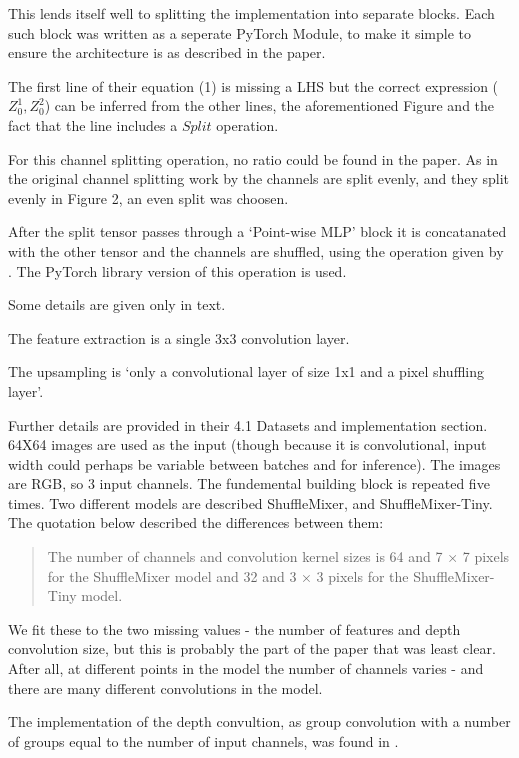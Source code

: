 \documentclass{article}
\begin{document}
    This lends itself well to splitting the implementation into separate blocks. Each such block was written as a seperate PyTorch Module, to make it simple to ensure the architecture is as described in the paper.

    The first line of their equation (1) is missing a LHS but the correct expression ($Z_0^1, Z_0^2$) can be inferred from the other lines, the aforementioned Figure and the fact that the line includes a $Split$ operation.

    For this channel splitting operation, no ratio could be found in the paper. As in the original channel splitting work by \citet{ma2018shufflenet} the channels are split evenly, and they split evenly in Figure 2, an even split was choosen.

    After the split tensor passes through a `Point-wise MLP' block it is concatanated with the other tensor and the channels are shuffled, using the operation given by \citet{zhang2017shufflenet}. The PyTorch library version of this operation is used.

    Some details are given only in text.

    The feature extraction is a single 3x3 convolution layer.

    The upsampling is `only a convolutional layer of size 1x1 and a pixel shuffling layer'.


    Further details are provided in their 4.1 Datasets and implementation section. 64X64 images are used as the input (though because it is convolutional, input width could perhaps be variable between batches and for inference). The images are RGB, so 3 input channels. The fundemental building block is repeated five times. Two different models are described ShuffleMixer, and ShuffleMixer-Tiny. The quotation below described the differences between them:

    \begin{quotation}
        The number of channels and convolution kernel sizes is 64 and
7 × 7 pixels for the ShuffleMixer model and 32 and 3 × 3 pixels for the ShuffleMixer-Tiny model.
    \end{quotation}

    We fit these to the two missing values - the number of features and depth convolution size, but this is probably the part of the paper that was least clear. After all, at different points in the model the number of channels varies - and there are many different convolutions in the model.

    The implementation of the depth convultion, as group convolution with a number of groups equal to the number of input channels, was found in \citet{liu2022convnet}.
\end{document}
